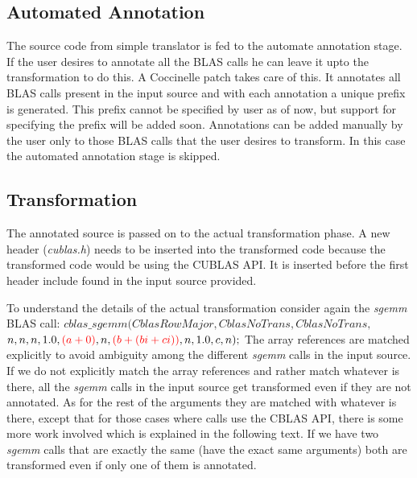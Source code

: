 \documentclass[12pt,a4paper]{article}
\begin{document}
\subsection{Automated Annotation}

The source code from simple translator is fed to the automate annotation stage.
If the user desires to annotate all the BLAS calls he can leave it upto the transformation to 
do this. A Coccinelle patch takes care of this. It annotates all BLAS calls present in the input source and with each annotation a unique prefix is generated. This prefix cannot be specified by user as of now, but support for specifying the prefix will be added soon.
Annotations can be added manually by the user only to those BLAS calls that the user
desires to transform. In this case the automated annotation stage is skipped.

\subsection{Transformation}
The annotated source is passed on to the actual transformation phase.
A new header (\textit{cublas.h}) needs to be inserted into the transformed code
because the transformed code would be using the CUBLAS API. It is inserted before
the first header include found in the input source provided.

To understand the details of the actual transformation consider again the \textit{sgemm} BLAS call:\vspace{2ex} 
\newline $cblas\_sgemm(CblasRowMajor, CblasNoTrans, CblasNoTrans,$ 
\newline \hspace*{24mm} $ n, n, n, 1.0,{\color{red} (a + 0)},n,{\color{red} (b + (bi + ci))}, n,1.0,c,n);$ \vspace*{2ex}
\newline The array references are matched explicitly to avoid ambiguity among the different
\textit{sgemm} calls in the input source. If we do not explicitly match the array references and rather match whatever is there, all the \textit{sgemm} calls in the input source get transformed even if they are not annotated. As for the rest of the arguments they are matched with whatever is there, except that for those cases where calls use the CBLAS API, there is some more work involved which is explained in the following text. If we have two \textit{sgemm} calls that are exactly the same (have the exact same arguments) both are transformed even if only one of them is annotated. 
\end{document}

